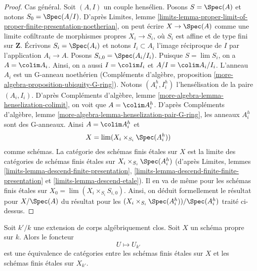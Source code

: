 \begin{proof}
\medskip\noindent
Cas général. Soit $(A, I)$ un couple hensélien.
Posons $S = \Spec(A)$ et notons $S_0 = \Spec(A/I)$. D'après Limites, lemme
\ref{limits-lemma-proper-limit-of-proper-finite-presentation-noetherian},
on peut écrire $X \to \Spec(A)$ comme une limite cofiltrante de
morphismes propres $X_i \to S_i$, où $S_i$ est affine et de type fini
sur $\mathbf{Z}$. Écrivons $S_i = \Spec(A_i)$ et notons
$I_i \subset A_i$ l'image réciproque de $I$ par l'application $A_i \to A$.
Posons $S_{i, 0} = \Spec(A_i/I_i)$. Puisque $S = \lim S_i$, on a
$A = \colim A_i$. Ainsi, on a aussi $I = \colim I_i$ et $A/I = \colim A_i/I_i$.
L'anneau $A_i$ est un G-anneau noethérien (Compléments d'algèbre, proposition
\ref{more-algebra-proposition-ubiquity-G-ring}).
Notons $(A_i^h, I_i^h)$ l'hensélisation de la paire $(A_i, I_i)$.
D'après Compléments d'algèbre, lemme \ref{more-algebra-lemma-henselization-colimit},
on voit que $A = \colim A_i^h$. D'après
Compléments d'algèbre, lemme \ref{more-algebra-lemma-henselization-pair-G-ring},
les anneaux $A_i^h$ sont des G-anneaux. Ainsi $A = \colim A_i^h$ et
$$
X = \lim (X_i \times_{S_i} \Spec(A_i^h))
$$
comme schémas. La catégorie des schémas finis étales sur $X$ est la limite
des catégories de schémas finis étales sur
$X_i \times_{S_i} \Spec(A_i^h)$ (d'après
Limites, lemmes
\ref{limits-lemma-descend-finite-presentation},
\ref{limits-lemma-descend-finite-finite-presentation} et
\ref{limits-lemma-descend-etale}).
Il en va de même pour les schémas finis étales sur
$X_0 = \lim (X_i \times_{S_i} S_{i, 0})$.
Ainsi, on déduit formellement le résultat pour $X / \Spec(A)$
du résultat pour les $(X_i \times_{S_i} \Spec(A_i^h)) / \Spec(A_i^h)$
traité ci-dessus.
\end{proof}

\begin{lemma}
\label{lemma-finite-etale-invariant-over-proper}
Soit $k'/k$ une extension de corps algébriquement clos.
Soit $X$ un schéma propre sur $k$. Alors le foncteur
$$
U \longmapsto U_{k'}
$$
est une équivalence de catégories entre les schémas finis étales sur
$X$ et les schémas finis étales sur $X_{k'}$.
\end{lemma}

